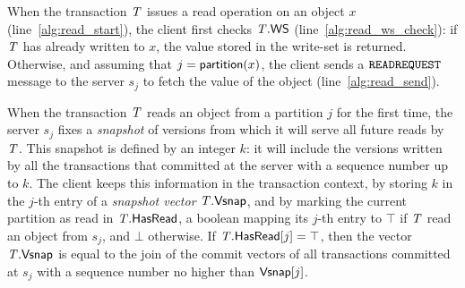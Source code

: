 When the transaction $\mathit{T}$ issues a read operation on an object $x$ (line~\ref{alg:read_start}), the client first checks $\mathit{T}.\mathsf{WS}$ (line~\ref{alg:read_ws_check}): if $\mathit{T}$ has already written to $x$, the value stored in the write-set is returned. Otherwise, and assuming that $j = \mathsf{partition}(x)$, the client sends a ${\tt READREQUEST}$ message to the server $s_j$ to fetch the value of the object (line~\ref{alg:read_send}).

When the transaction $\mathit{T}$ reads an object from a partition $j$ for the first time, the server $s_j$ fixes a \emph{snapshot} of versions from which it will serve all future reads by $\mathit{T}$. This snapshot is defined by an integer $k$: it will include the versions written by all the transactions that committed at the server with a sequence number up to $k$. The client keeps this information in the transaction context, by storing $k$ in the $j$-th entry of a \emph{snapshot vector} $\mathit{T}.\mathsf{Vsnap}$, and by marking the current partition as read in $\mathit{T}.\mathsf{HasRead}$, a boolean mapping its $j$-th entry to $\top$ if $\mathit{T}$ read an object from $s_j$, and $\bot$ otherwise. If $\mathit{T}.\mathsf{HasRead}[j]=\top$, then the vector $\mathit{T}.\mathsf{Vsnap}$ is equal to the join of the commit vectors of all transactions committed at $s_j$ with a sequence number no higher than $\mathsf{Vsnap}[j]$.

